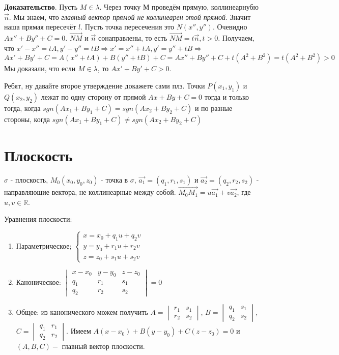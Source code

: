 \documentclass[a4paper]{article}
\begin{document}
{\begin{small}
\textbf{Доказательство}. Пусть $M \in \lambda$. Через точку М проведём прямую, коллинеарнубю $\vec{n}$. Мы знаем, что \textit{главный вектор прямой не коллинеарен этой прямой}. Значит наша прямая пересечёт $l$. Пусть точка пересечения это $N(x'', y'')$. Очевидно $Ax'' + By'' + C = 0$. $\overrightarrow{NM}$ и $\vec{n}$ сонаправлены, то есть $\overrightarrow{NM} = t \vec{n}, t>0$. Получаем, что $x' -x'' = tA, y'-y'' = tB \Rightarrow x' = x'' + tA, y' = y'' + tB \Rightarrow$ \newline \begin{equation}
Ax' + By' + C = A(x'' + tA) + B(y'' + tB) + C = Ax'' + By'' + C + t(A^2 + B^2) = t(A^2+B^2)>0
\end{equation}
Мы доказали, что если $M \in \lambda$, то $Ax' + By' + C > 0$. 

Ребят, ну давайте второе утверждение докажете сами плз.
\newline
Точки $P(x_1, y_1)$ и $Q(x_2, y_2)$ лежат по одну сторону от прямой $Ax+By+C=0$ тогда и только тогда, когда $sgn (Ax_1+By_1+C) = sgn (Ax_2+By_2+C)$ и по разные стороны, когда $sgn (Ax_1+By_1+C) \neq sgn (Ax_2+By_2+C)$



\section*{Плоскость}

$\sigma$ - плоскость, $M_0(x_0, y_0, z_0)$ - точка в $\sigma$, $\vec{a_1} = (q_1, r_1, s_1)$ и $\vec{a_2} = (q_2, r_2, s_2)$ - направляющие вектора, не коллинеарные между собой.
$\overrightarrow{M_0M_1} = u\vec{a_1} + v\vec{a_2}$, где $u, v \in \mathbb{R}$.


Уравнения плоскости: \begin{enumerate}
\item Параметрическое; $
\begin{cases}
   x = x_0 + q_1u + q_2v 
   \\
   y = y_0 + r_1u + r_2v
   \\
   z = z_0 + s_1u + s_2v  
 \end{cases}
$
\item Каноническое: $\begin{vmatrix}
	x-x_0& y-y_0& z-z_0\\
	q_1& r_1& s_1\\
	q_2& r_2& s_2
\end{vmatrix} = 0$

\item Общее: из канонического можем получить $A = \begin{vmatrix}
	r_1& s_1\\
	r_2&s_2
\end{vmatrix}$, $B = \begin{vmatrix}
	q_1& s_1\\
	q_2&s_2
\end{vmatrix}$, $C = \begin{vmatrix}
	q_1& r_1\\
	q_2&r_2
\end{vmatrix}$. Имеем $A(x-x_0)+B(y-y_0)+C(z-z_0) = 0$ и $(A,B,C) -$  главный	 вектор плоскости.
\end{enumerate}


\end{small}}
\end{document}
